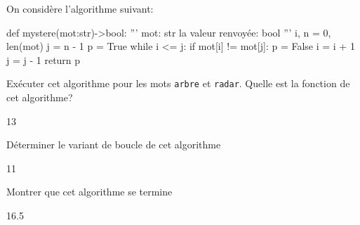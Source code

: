 \documentclass[a4paper,10pt]{report}
\def\ptsexoB{4}
\def\ptsexoC{3}
\begin{document}
\exods{\ptsexoB}

    \begin{enumerate}
\begin{minipage}{0.48\linewidth}
    On considère l'algorithme suivant:

\begin{CodePythontexAlt}[Largeur=1\linewidth,Centre,PremLigne=1]{}
def mystere(mot:str)->bool:
    ''' mot: str
    la valeur renvoyée: bool '''
    i, n = 0, len(mot)
    j = n - 1
    p = True
    while i <= j:
        if mot[i] != mot[j]:
            p = False
        i = i + 1
        j = j - 1
    return p
\end{CodePythontexAlt}
\item Exécuter cet algorithme pour les mots \verb+arbre+ et \verb+radar+. Quelle est la fonction de cet algorithme?
    
    \begin{answer}{1}{3}    \end{answer}

\end{minipage}\hfill
\begin{minipage}{0.48\linewidth}
    
    
    \item Déterminer le variant de boucle de cet algorithme
    
    
    \begin{answer}{1}{1}    \end{answer}
    \item Montrer que cet algorithme se termine
    \begin{answer}{1}{6.5}    \end{answer}
\end{minipage}

\end{enumerate}


      \newpage
  
      \thispagestyle{DS_LP}          %

\exods{\ptsexoC}
\end{document}
